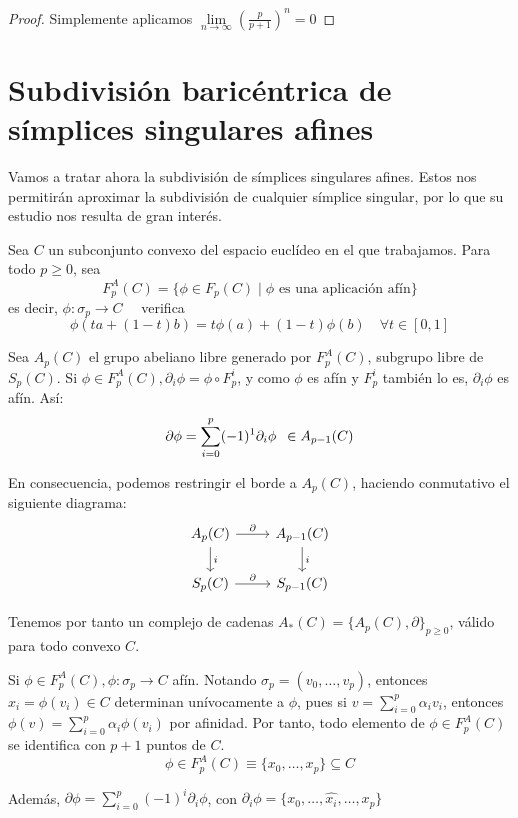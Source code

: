 \begin{proof}
  Simplemente aplicamos $\lim\limits_{n \to \infty}(\frac{p}{p+1})^n = 0$
\end{proof}

\section{Subdivisión baricéntrica de símplices singulares afines}

Vamos a tratar ahora la subdivisión de símplices singulares afines. Estos nos permitirán aproximar la
subdivisión de cualquier símplice singular, por lo que su estudio nos resulta de gran interés.

Sea $C$ un subconjunto convexo del espacio euclídeo en el que trabajamos. Para todo $p \geq 0$, sea
\[F_p^A(C) = \{ \phi \in F_p(C) \mid \phi \text{ es una aplicación afín}\} \]
es decir, $\phi \colon \sigma_p \to C \quad$ verifica \[\phi(ta + (1-t)b) = t\phi(a) + (1-t)\phi(b) \hspace{1em} \forall t \in [0,1]\]

Sea $A_p(C)$ el grupo abeliano libre generado por $F_p^A(C)$, subgrupo libre de $S_p(C)$. Si $\phi \in F_p^A(C), \partial_i \phi = \phi \circ F_p^i$,
y como $\phi$ es afín y $F_p^i$ también lo es, $\partial_i \phi$ es afín. Así:
\[\partial \phi = \sum\limits_{i = 0}^p (-1)^1 \partial_i \phi \hspace{0.5em} \in A_{p-1}(C)\]

En consecuencia, podemos restringir el borde a $A_p(C)$, haciendo conmutativo el siguiente diagrama:
\[ \begin{tikzcd}
      A_p(C) \arrow{r}{\partial} \arrow{d}{i} & A_{p-1}(C) \arrow{d}{i} \\
      S_p(C) \arrow{r}{\partial} & S_{p-1}(C)
\end{tikzcd} \]

Tenemos por tanto un complejo de cadenas $A_*(C) = \{A_p(C), \partial\}_{p \geq 0}$, válido para todo convexo $C$.

Si $\phi \in F_p^A(C), \phi \colon \sigma_p \to C$ afín. Notando $\sigma_p = (v_0, \dots, v_p)$, entonces
${x_i = \phi(v_i) \in C}$ determinan unívocamente a $\phi$, pues si $v = \sum\limits_{i = 0}^p \alpha_i v_i$, entonces
$\phi(v) = \sum\limits_{i = 0}^p \alpha_i \phi(v_i)$ por afinidad. Por tanto, todo elemento de $\phi \in F_p^A(C)$ se
identifica con $p+1$ puntos de $C$.
\[\phi \in F_p^A(C) \equiv \{x_0, \dots, x_p\} \subseteq C\]

Además, $\partial \phi = \sum\limits_{i = 0}^p (-1)^i \partial_i \phi$, con $\partial_i \phi = \{x_0, \dots, \hat{x_i}, \dots, x_p\}$

